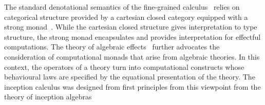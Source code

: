 The standard denotational semantics of the fine-grained calculus~\cite{Levy}
relies on categorical structure provided by a cartesian closed category
equipped with a strong monad~\cite{Moggi}.  While the cartesian closed
structure gives interpretation to type structure, the strong monad
encapsulates and provides interpretation for effectful computations.  The
theory of algebraic effects~\cite{PlotkinPower} further advocates the
consideration of computational monads that arise from algebraic theories.  In
this context, the operators of a theory turn into computational constructs
whose behavioural laws are specified by the equational presentation of the
theory.  The inception calculus was designed from first principles from this
viewpoint from the theory of inception algebras~\cite{FioreIHP2014}

